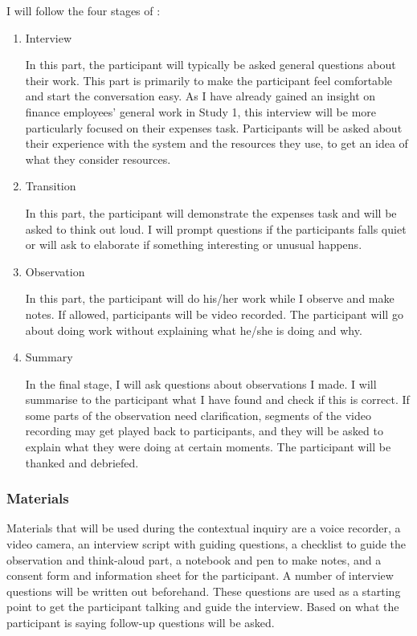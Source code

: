 \documentclass[11pt,oneside]{report}
\begin{document}
I will follow the four stages of \citet{Beyer1998}:
\begin{enumerate}
\item 
Interview

In this part, the participant will typically be asked general questions about their work. This part is primarily to make the participant feel comfortable and start the conversation easy. As I have already gained an insight on finance employees' general work in Study 1, this interview will be more particularly focused on their expenses task. Participants will be asked about their experience with the system  and the resources they use, to get an idea of what they consider resources.
\item 
Transition

In this part, the participant will demonstrate the expenses task and will be asked to think out loud. I will prompt questions if the participants falls quiet or will ask to elaborate if something interesting or unusual happens.
\item 
Observation

In this part, the participant will do his/her work while I observe and make notes. If allowed, participants will be video recorded. The participant will go about doing work without explaining what he/she is doing and why. 
\item 
Summary

In the final stage, I will ask questions about observations I made. I will summarise to the participant what I have found and check if this is correct. If some parts of the observation need clarification, segments of the video recording may get played back to participants, and they will be asked to explain what they were doing at certain moments.
The participant will be thanked and debriefed.
\end{enumerate}

\subsubsection{Materials}
Materials that will be used during the contextual inquiry are a voice recorder, a video camera, an interview script with guiding questions, a checklist to guide the observation and think-aloud part, a notebook and pen to make notes, and a consent form and information sheet for the participant.
A number of interview questions will be written out beforehand. These questions are used as a starting point to get the participant talking and guide the interview. Based on what the participant is saying follow-up questions will be asked. 
\end{document}
